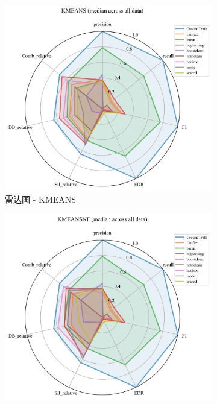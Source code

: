 \documentclass[10pt]{article} %
\numberwithin{equation}{section}
\begin{document}
\begin{enumerate}[label=(\alph*)]
\begin{figure}[htbp]
    \begin{subfigure}[b]{0.30\linewidth}
        \centering
        \includegraphics[width=\linewidth]{figures/radar graph/radar_KMEANS.png}
        \caption{雷达图 - KMEANS}
        \label{fig:radar_kmeans}
    \end{subfigure}
    \hfill
    \begin{subfigure}[b]{0.30\linewidth}
        \centering
        \includegraphics[width=\linewidth]{figures/radar graph/radar_KMEANSNF.png}

\end{subfigure}
\end{figure}
\end{enumerate}
\end{document}
